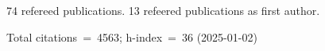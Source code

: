 74 refereed publications. 13 refeered publications as first author.

Total citations~=~4563; h-index~=~36 (2025-01-02)